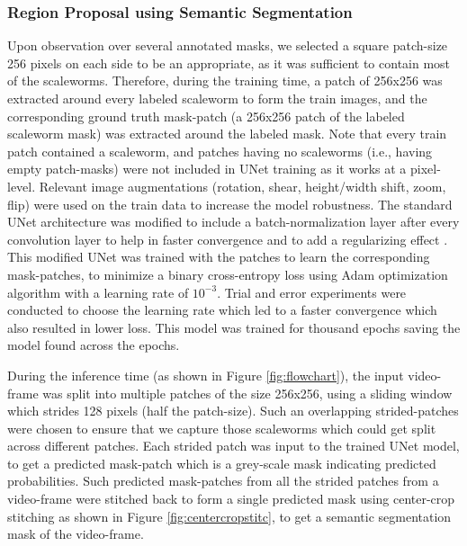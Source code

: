 \documentclass[10pt,twocolumn,letterpaper]{article}
\begin{document}
\subsubsection{Region Proposal using Semantic Segmentation}
Upon observation over several annotated masks, we selected a square patch-size 256 pixels on each side to be an appropriate, as it was sufficient to contain most of the scaleworms. Therefore, during the training time, a patch of 256x256 was extracted around every labeled scaleworm to form the train images, and the corresponding ground truth mask-patch (a 256x256 patch of the labeled scaleworm mask) was extracted around the labeled mask. Note that every train patch contained a scaleworm, and patches having no scaleworms (i.e., having empty patch-masks) were not included in UNet training as it works at a pixel-level. Relevant image augmentations (rotation, shear, height/width shift, zoom, flip) were used on the train data to increase the model robustness. The standard UNet architecture \cite{unet} was modified to include a batch-normalization layer after every convolution layer to help in faster convergence and to add a regularizing effect \cite{batchnorm}. This modified UNet was trained with the patches to learn the corresponding mask-patches, to minimize a binary cross-entropy loss using Adam optimization algorithm with a learning rate of $10^{-3}$. Trial and error experiments were conducted to choose the learning rate which led to a faster convergence which also resulted in lower loss.
This model was trained for thousand epochs saving the model found across the epochs. %

During the inference time (as shown in Figure \ref{fig:flowchart}), the input video-frame was split into multiple patches of the size 256x256, using a sliding window which strides 128 pixels (half the patch-size). Such an overlapping strided-patches were chosen to ensure that we capture those scaleworms which could get split across different patches. Each strided patch was input to the trained UNet model, to get a predicted mask-patch which is a grey-scale mask indicating predicted probabilities. Such predicted mask-patches from all the strided patches from a video-frame were stitched back to form a single predicted mask using center-crop stitching as shown in Figure \ref{fig:centercropstitc}, to get a semantic segmentation mask of the video-frame.
\end{document}
